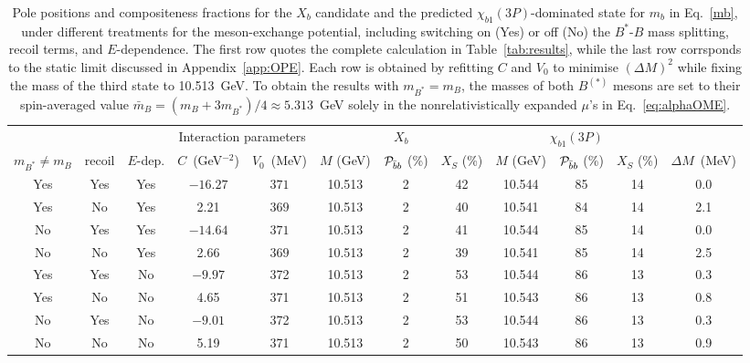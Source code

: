 \documentclass[aps,prd,showpacs,amsmath,twocolumn,superscriptaddress,floatfix,nofootinbib,notitlepage]{revtex4-2}
\newcommand{\Xb}{X_b}
\newcommand{\unit}[1]{~(#1)}
\begin{document}
\begin{table}[t!]
\centering
\caption{Pole positions and compositeness fractions for the $\Xb$ candidate and the predicted $\chi_{b1}(3P)$-dominated state for $m_b$ in Eq.~\eqref{mb}, under different treatments for the meson-exchange potential, including switching on (Yes) or off (No) the $B^*$-$B$ mass splitting, recoil terms, and $E$-dependence. The first row quotes the complete calculation in Table~\ref{tab:results}, while the last row corrsponds to the static limit discussed in Appendix~\ref{app:OPE}.
Each row is obtained by refitting $C$ and $V_0$ to minimise $(\Delta M)^2$ while fixing the mass of the third state to 10.513~GeV.
To obtain the results with $m_{B^*}=m_{B}$, the masses of both $B^{(*)}$ mesons are set to their spin-averaged value $\bar{m}_B=(m_B+3m_{B^*})/4\approx5.313$~GeV solely in the nonrelativistically expanded $\mu$'s in Eq.~\eqref{eq:alphaOME}.} 
\label{tab:approximations}
\begin{ruledtabular}
\begin{tabular}{ccc|cc|ccc|ccc|c}
\multicolumn{3}{c|}{} &
\multicolumn{2}{c|}{Interaction parameters} &
\multicolumn{3}{c|}{$\Xb$} &
\multicolumn{3}{c|}{$\chi_{b1}(3P)$} &
\multicolumn{1}{c}{} \\
$m_{B^*}\neq m_B$ & recoil & $E$-dep.
& $C$\unit{GeV$^{-2}$} & $V_0$\unit{MeV}
& $M$ (GeV) & ${\cal P}_{\bar{b}b}$ (\%) & $X_S$ (\%)
& $M$ (GeV) & ${\cal P}_{\bar{b}b}$ (\%) & $X_S$ (\%)
& $\Delta M$\unit{MeV} \\
\hline
Yes & Yes & Yes & $-16.27$ & $371$
& 10.513 & 2 & 42
& 10.544 & 85 & 14 & 0.0 \\
Yes & No & Yes & 2.21 & $369$
& 10.513 & 2 & 40
& 10.541 & 84 & 14 & 2.1 \\
No & Yes & Yes & $-14.64$ & $371$
& 10.513 & 2 & 41
& 10.544 & 85 & 14 & 0.0 \\
No & No & Yes & 2.66 & $369$
& 10.513 & 2 & 39
& 10.541 & 85 & 14 & 2.5\\ 
Yes & Yes & No & $-9.97$ & 372 & 10.513 & 2 & 53 & 10.544 & 86 & 13 & 0.3 \\
Yes & No & No & 4.65 & 371 & 10.513 & 2 & 51 & 10.543 & 86 & 13 & 0.8 \\
No & Yes & No & $-9.01$ & 372 & 10.513 & 2 & 53 & 10.544 & 86 & 13 & 0.3 \\
No & No & No & 5.19 & 371 & 10.513 & 2 & 50 & 10.543 & 86 & 13 & 0.9 
\end{tabular}
\end{ruledtabular}
\end{table}
\end{document}
